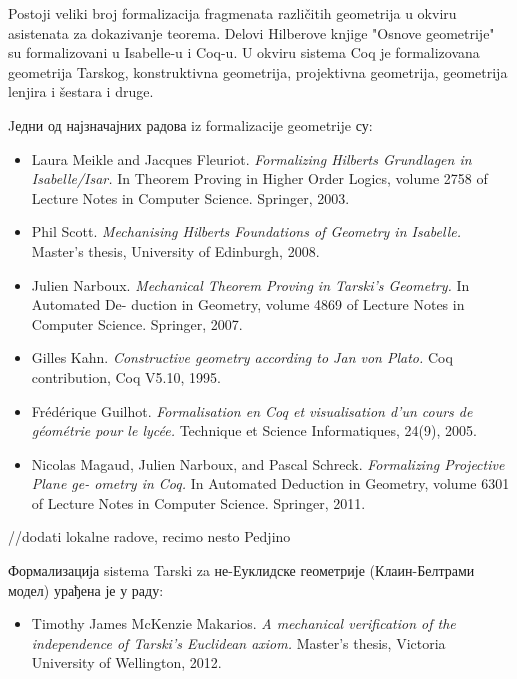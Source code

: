 \documentclass{article}
\begin{document}
Postoji veliki broj formalizacija fragmenata razli\v citih geometrija
u okviru asistenata za dokazivanje teorema. Delovi Hilberove knjige
"Osnove geometrije" su formalizovani u {\lat Isabelle}-u i {\lat
Coq}-u. U okviru sistema {\lat Coq} je formalizovana geometrija
Tarskog, konstruktivna geometrija, projektivna geometrija, geometrija
lenjira i \v sestara i druge. 

Jедни од најзначајних радова iz formalizacije geometrije су:
\begin{itemize}
\item {\lat Laura Meikle and Jacques Fleuriot. {\em Formalizing Hilberts Grundlagen in Isabelle/Isar.}
In Theorem Proving in Higher Order Logics, volume 2758 of Lecture Notes in Computer
Science. Springer, 2003.}

\item {\lat Phil Scott. {\em Mechanising Hilberts Foundations of Geometry in Isabelle.} Master’s thesis,
University of Edinburgh, 2008.}

\item {\lat Julien Narboux. {\em Mechanical Theorem Proving in Tarski’s Geometry.} In Automated De-
duction in Geometry, volume 4869 of Lecture Notes in Computer Science. Springer, 2007.}

\item {\lat Gilles Kahn. {\em Constructive geometry according to Jan von Plato.} Coq contribution, Coq
V5.10, 1995.}

\item {\lat Fr\'ed\'erique Guilhot. {\em Formalisation en Coq et visualisation d’un cours de g\'eom\'etrie pour
le lyc\'ee.} Technique et Science Informatiques, 24(9), 2005.}

\item Nicolas Magaud, Julien Narboux, and Pascal Schreck. {\em Formalizing Projective Plane ge-
ometry in Coq.} In Automated Deduction in Geometry, volume 6301 of Lecture Notes in
Computer Science. Springer, 2011.
\end{itemize}

//dodati lokalne radove, recimo nesto Pedjino

Формализација sistema Tarski za не-Еуклидске геометрије (Клаин-Белтрами модел) урађена је у раду:
\begin{itemize}
\item {\lat Timothy James McKenzie Makarios. {\em A mechanical verification of the independence of
Tarski’s Euclidean axiom.} Master’s thesis, Victoria University of Wellington, 2012.}
\end{itemize}
\end{document}
